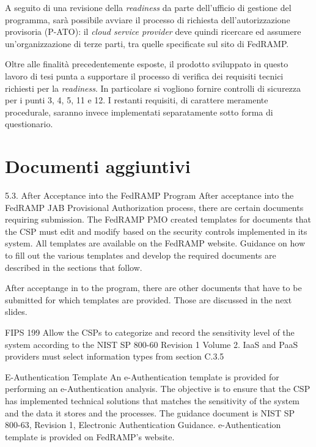 \documentclass[../main.tex]{subfiles}
\begin{document}
A seguito di una revisione della \textit{readiness} da parte dell'ufficio di gestione del programma, sarà possibile avviare il processo di richiesta dell'autorizzazione provisoria (P-ATO): il \textit{cloud service provider} deve quindi ricercare ed assumere un'organizzazione di terze parti, tra quelle specificate sul sito di FedRAMP.

Oltre alle finalità precedentemente esposte, il prodotto sviluppato in questo lavoro di tesi punta a supportare il processo di verifica dei requisiti tecnici richiesti per la \textit{readiness}. In particolare si vogliono fornire controlli di sicurezza per i punti 3, 4, 5, 11 e 12.
I restanti requisiti, di carattere meramente procedurale, saranno invece implementati separatamente sotto forma di questionario.



\section{Documenti aggiuntivi}

5.3. After Acceptance into the FedRAMP Program
After acceptance into the FedRAMP JAB Provisional Authorization process, there are certain documents requiring submission.  The FedRAMP PMO created templates for documents that the CSP must edit and modify based on the security controls implemented in its system.  All templates are available on the FedRAMP website.  Guidance on how to fill out the various templates and develop the required documents are described in the sections that follow.  




After acceptange in to the program, there are other documents that have to be submitted for which templates are provided.
Those are discussed in the next slides.



FIPS 199
Allow the  CSPs to categorize and record the sensitivity level of the system according to the NIST SP 800-60 Revision 1 Volume 2.
IaaS and PaaS providers must select information types from section C.3.5

E-Authentication Template
An e-Authentication template is provided for performing an e-Authentication analysis. The objective is to ensure that the CSP has implemented technical solutions that matches the sensitivity of the system and the data it stores and the processes.
The guidance document is NIST SP 800-63, Revision 1, Electronic Authentication Guidance.
e-Authentication template is provided on FedRAMP’s website.
\end{document}
